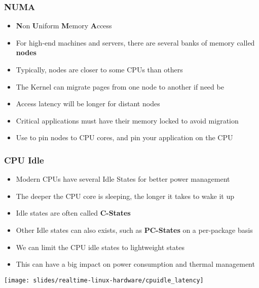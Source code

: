 \begin{frame}
        \frametitle{NUMA}
        \begin{itemize}
                \item \textbf{N}on \textbf{U}niform \textbf{M}emory \textbf{A}ccess
                \item For high-end machines and servers, there are several banks of memory called \textbf{nodes}
                \item Typically, nodes are closer to some CPUs than others 
                \item The Kernel can migrate pages from one node to another if need be
                \item Access latency will be longer for distant nodes
                \item Critical applications must have their memory locked to avoid migration
                \item Use  to pin nodes to CPU cores, and pin your application on the CPU
        \end{itemize}
\end{frame}

\begin{frame}
        \frametitle{CPU Idle}
        \begin{itemize}
                \item Modern CPUs have several Idle States for better power management
                \item The deeper the CPU core is sleeping, the longer it takes to wake it up
                \item Idle states are often called \textbf{C-States}
                \item Other Idle states can also exists, such as \textbf{PC-States} on a per-package basis
                \item We can limit the CPU idle states to lightweight states
                \item This can have a big impact on power consumption and thermal management
        \end{itemize}
        \texttt{[image: slides/realtime-linux-hardware/cpuidle\_latency]}
\end{frame}

